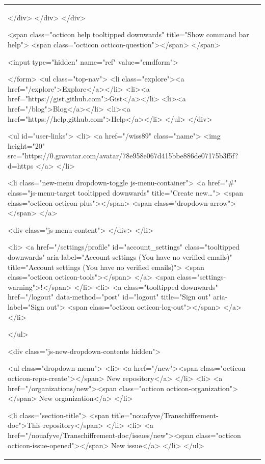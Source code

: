 \documentclass[a4paper,11pt,french]{article}
\begin{document}
\begin{tabular}{|m{8cm}|m{8cm}|}
        </div>
      </div>
    </div>

  <span class="octicon help tooltipped downwards" title="Show command bar help">
    <span class="octicon octicon-question"></span>
  </span>


  <input type="hidden" name="ref" value="cmdform">

</form>
        <ul class="top-nav">
          <li class="explore"><a href="/explore">Explore</a></li>
            <li><a href="https://gist.github.com">Gist</a></li>
            <li><a href="/blog">Blog</a></li>
          <li><a href="https://help.github.com">Help</a></li>
        </ul>
      </div>

    


  <ul id="user-links">
    <li>
      <a href="/wiss89" class="name">
        <img height="20" src="https://0.gravatar.com/avatar/78e958e067d415bbe886de07175b3f5f?d=https%
      </a>
    </li>

      <li class="new-menu dropdown-toggle js-menu-container">
        <a href="#" class="js-menu-target tooltipped downwards" title="Create new…">
          <span class="octicon octicon-plus"></span>
          <span class="dropdown-arrow"></span>
        </a>

        <div class="js-menu-content">
        </div>
      </li>

      <li>
        <a href="/settings/profile" id="account_settings"
          class="tooltipped downwards"
          aria-label="Account settings (You have no verified emails)"
          title="Account settings (You have no verified emails)">
          <span class="octicon octicon-tools"></span>
        </a>
          <span class="settings-warning">!</span>
      </li>
      <li>
        <a class="tooltipped downwards" href="/logout" data-method="post" id="logout" title="Sign out" aria-label="Sign out">
          <span class="octicon octicon-log-out"></span>
        </a>
      </li>

  </ul>

<div class="js-new-dropdown-contents hidden">
  

<ul class="dropdown-menu">
  <li>
    <a href="/new"><span class="octicon octicon-repo-create"></span> New repository</a>
  </li>
  <li>
    <a href="/organizations/new"><span class="octicon octicon-organization"></span> New organization</a>
  </li>



    <li class="section-title">
      <span title="nouafyve/Transchiffrement-doc">This repository</span>
    </li>
      <li>
        <a href="/nouafyve/Transchiffrement-doc/issues/new"><span class="octicon octicon-issue-opened"></span> New issue</a>
      </li>
</ul>


\end{tabular}
\end{document}

